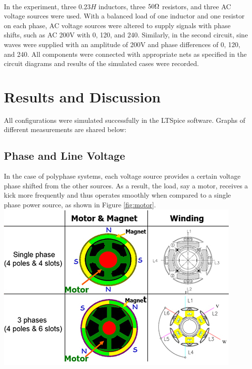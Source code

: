 \documentclass[journal]{IEEEtran}
\begin{document}
\\

\noindent In the experiment, three 0.23$H$ inductors, three $50\ohm$ resistors, and three AC voltage sources were used. With a balanced load of one inductor and one resistor on each phase, AC voltage sources were altered to supply signals with phase shifts, such as AC 200V with 0\degree, 120\degree, and 240\degree. Similarly, in the second circuit, sine waves were supplied with an amplitude of 200V and phase differences of 0\degree, 120\degree, and 240\degree. All components were connected with appropriate nets as specified in the circuit diagrams and results of the simulated cases were recorded.

\section{Results and Discussion}

\noindent All configurations were simulated successfully in the LTSpice software. Graphs of different measurements are shared below:


\subsection{Phase and Line Voltage}

\noindent In the case of polyphase systems, each voltage source provides a certain voltage phase shifted from the other sources. As a result, the load, say a motor, receives a kick more frequently and thus operates smoothly when compared to a single phase power source, as shown in Figure \ref{fig:motor}.\\

\begingroup
    \centering
    \medskip
    \includegraphics[width=\columnwidth]{images/motor.jpg}
    \label{fig:motor}
    \medskip
\endgroup
\end{document}
